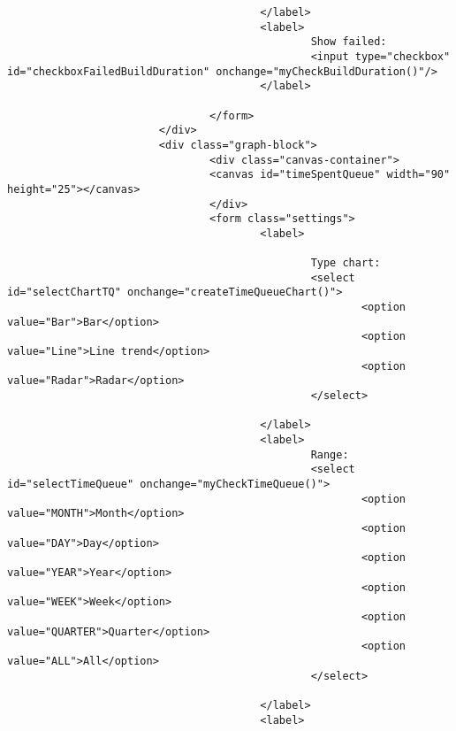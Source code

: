 \begin{lstlisting}
                                        </label>
                                        <label>
                                                Show failed:
                                                <input type="checkbox" id="checkboxFailedBuildDuration" onchange="myCheckBuildDuration()"/>
                                        </label>

                                </form>
                        </div>
                        <div class="graph-block">
                                <div class="canvas-container">
                                <canvas id="timeSpentQueue" width="90" height="25"></canvas>
                                </div>
                                <form class="settings">
                                        <label>

                                                Type chart:
                                                <select id="selectChartTQ" onchange="createTimeQueueChart()">
                                                        <option value="Bar">Bar</option>
                                                        <option value="Line">Line trend</option>
                                                        <option value="Radar">Radar</option>
                                                </select>

                                        </label>
                                        <label>
                                                Range:
                                                <select id="selectTimeQueue" onchange="myCheckTimeQueue()">
                                                        <option value="MONTH">Month</option>
                                                        <option value="DAY">Day</option>
                                                        <option value="YEAR">Year</option>
                                                        <option value="WEEK">Week</option>
                                                        <option value="QUARTER">Quarter</option>
                                                        <option value="ALL">All</option>
                                                </select>

                                        </label>
                                        <label>


\end{lstlisting}
